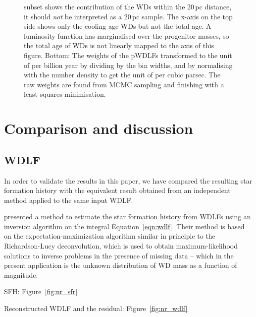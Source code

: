 \documentclass[fleqn,usenatbib]{mnras}
\begin{document}
\begin{figure}
{    subset shows the contribution of the WDs within the 20\,pc distance, it
    should \textit{not} be interpreted as a 20\,pc sample. The x-axis on
    the top side shows only the cooling age WDs but not the total age. A
    luminosity function has marginalised over the progenitor masses, so the total
    age of WDs is not linearly mapped to the axis of this figure. Bottom: The
    weights of the pWDLFs transformed to the unit of per billion year by dividing
    by the bin widths, and by normalising with the number density to get the
    unit of per cubic parsec. The raw weights are found from MCMC sampling
    and finishing with a least-squares minimisation.}
    \label{fig:sfh_optimal}
\end{figure}


\section{Comparison and discussion}
\label{sec:comparison}

\subsection{WDLF}
\label{sec:inversion}
In order to validate the results in this paper, we have compared the
resulting star formation history with the equivalent result obtained from an
independent method applied to the same input WDLF.

\citet{2013MNRAS.434.1549R} presented a method to estimate the star formation
history from WDLFs using an inversion algorithm on the integral 
Equation~\ref{eqn:wdlf}. Their method is based on the expectation-maximization
algorithm similar in principle to the Richardson-Lucy deconvolution, which is
used to obtain maximum-likelihood solutions to inverse problems in the presence 
of missing data -- which in the present application is the unknown distribution
of WD mass as a function of magnitude.

SFH: Figure~\ref{fig:nr_sfr}

Reconstructed WDLF and the residual: Figure~\ref{fig:nr_wdlf}
\end{document}
